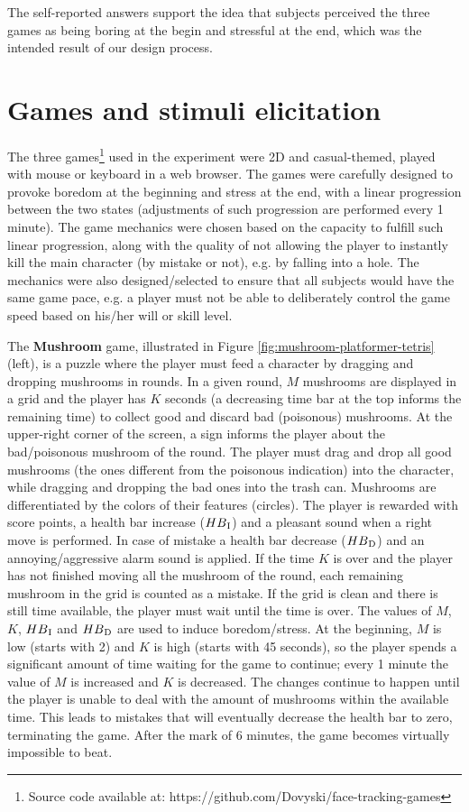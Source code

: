 The self-reported answers support the idea that subjects perceived the three games as being boring at the begin and stressful at the end, which was the intended result of our design process.

\section{Games and stimuli elicitation}

The three games\footnote{Source code available at: https://github.com/Dovyski/face-tracking-games} used in the experiment were 2D and casual-themed, played with mouse or keyboard in a web browser. The games were carefully designed to provoke boredom at the beginning and stress at the end, with a linear progression between the two states (adjustments of such progression are performed every 1 minute). The game mechanics were chosen based on the capacity to fulfill such linear progression, along with the quality of not allowing the player to instantly kill the main character (by mistake or not), e.g. by falling into a hole. The mechanics were also designed/selected to ensure that all subjects would have the same game pace, e.g. a player must not be able to deliberately control the game speed based on his/her will or skill level.

The \textbf{Mushroom} game, illustrated in Figure \ref{fig:mushroom-platformer-tetris} (left), is a puzzle where the player must feed a character by dragging and dropping mushrooms in rounds. In a given round, $M$ mushrooms are displayed in a grid and the player has $K$ seconds (a decreasing time bar at the top informs the remaining time) to collect good and discard bad (poisonous) mushrooms. At the upper-right corner of the screen, a sign informs the player about the bad/poisonous mushroom of the round. The player must drag and drop all good mushrooms (the ones different from the poisonous indication) into the character, while dragging and dropping the bad ones into the trash can. Mushrooms are differentiated by the colors of their features (circles). The player is rewarded with score points, a health bar increase ($HB\textsubscript{I}$) and a pleasant sound when a right move is performed. In case of mistake a health bar decrease ($HB\textsubscript{D}$) and an annoying/aggressive alarm sound is applied. If the time $K$ is over and the player has not finished moving all the mushroom of the round, each remaining mushroom in the grid is counted as a mistake. If the grid is clean and there is still time available, the player must wait until the time is over. The values of $M$, $K$, $HB\textsubscript{I}$ and $HB\textsubscript{D}$ are used to induce boredom/stress. At the beginning, $M$ is low (starts with 2) and $K$ is high (starts with 45 seconds), so the player spends a significant amount of time waiting for the game to continue; every 1 minute the value of $M$ is increased and $K$ is decreased. The changes continue to happen until the player is unable to deal with the amount of mushrooms within the available time. This leads to mistakes that will eventually decrease the health bar to zero, terminating the game. After the mark of 6 minutes, the game becomes virtually impossible to beat.

